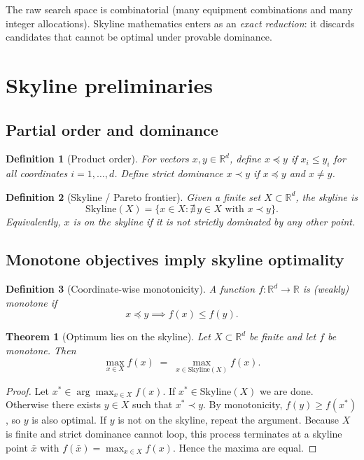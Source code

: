 \documentclass[11pt]{article}
\theoremstyle{plain}
\newtheorem{theorem}{Theorem}
\newtheorem{definition}{Definition}
\begin{document}
The raw search space is combinatorial (many equipment combinations and many integer allocations). Skyline mathematics enters as an \emph{exact reduction}: it discards candidates that cannot be optimal under provable dominance.

\section{Skyline preliminaries}

\subsection{Partial order and dominance}
\begin{definition}[Product order]
For vectors $x,y\in\mathbb{R}^d$, define $x\preceq y$ if $x_i\le y_i$ for all coordinates $i=1,\dots,d$. Define strict dominance $x\prec y$ if $x\preceq y$ and $x\neq y$.
\end{definition}

\begin{definition}[Skyline / Pareto frontier]
Given a finite set $X\subset\mathbb{R}^d$, the skyline is
\[
\mathrm{Skyline}(X) = \{x\in X : \nexists\,y\in X\text{ with } x\prec y\}.
\]
Equivalently, $x$ is on the skyline if it is not strictly dominated by any other point.
\end{definition}

\subsection{Monotone objectives imply skyline optimality}
\begin{definition}[Coordinate-wise monotonicity]
A function $f:\mathbb{R}^d\to\mathbb{R}$ is (weakly) monotone if
\[ x\preceq y \implies f(x)\le f(y). \]
\end{definition}

\begin{theorem}[Optimum lies on the skyline]
\label{thm:skyline-opt}
Let $X\subset\mathbb{R}^d$ be finite and let $f$ be monotone. Then
\[
\max_{x\in X} f(x) \;=\; \max_{x\in \mathrm{Skyline}(X)} f(x).
\]
\end{theorem}

\begin{proof}
Let $x^*\in\arg\max_{x\in X} f(x)$. If $x^*\in\mathrm{Skyline}(X)$ we are done. Otherwise there exists $y\in X$ such that $x^*\prec y$. By monotonicity, $f(y)\ge f(x^*)$, so $y$ is also optimal. If $y$ is not on the skyline, repeat the argument. Because $X$ is finite and strict dominance cannot loop, this process terminates at a skyline point $\bar{x}$ with $f(\bar{x})=\max_{x\in X} f(x)$. Hence the maxima are equal.
\end{proof}
\end{document}
